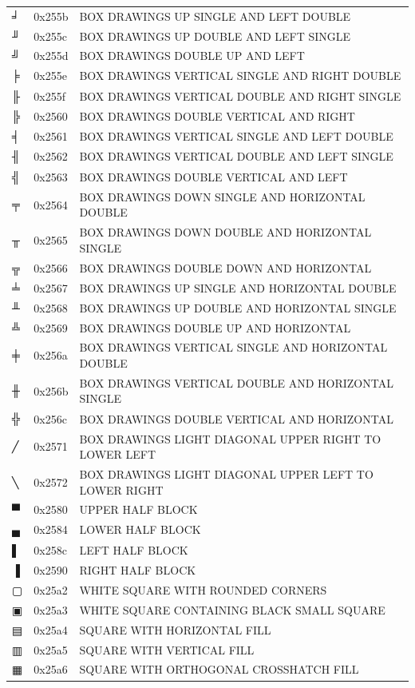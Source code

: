 \documentclass[12pt, twoside]{article}
\begin{document}
\begin{longtable}{L{1.0cm} L{2.0cm} >{\footnotesize}L{10cm}}
$╛$&0x255b&BOX DRAWINGS UP SINGLE AND LEFT DOUBLE\\
$╜$&0x255c&BOX DRAWINGS UP DOUBLE AND LEFT SINGLE\\
$╝$&0x255d&BOX DRAWINGS DOUBLE UP AND LEFT\\
$╞$&0x255e&BOX DRAWINGS VERTICAL SINGLE AND RIGHT DOUBLE\\
$╟$&0x255f&BOX DRAWINGS VERTICAL DOUBLE AND RIGHT SINGLE\\
$╠$&0x2560&BOX DRAWINGS DOUBLE VERTICAL AND RIGHT\\
$╡$&0x2561&BOX DRAWINGS VERTICAL SINGLE AND LEFT DOUBLE\\
$╢$&0x2562&BOX DRAWINGS VERTICAL DOUBLE AND LEFT SINGLE\\
$╣$&0x2563&BOX DRAWINGS DOUBLE VERTICAL AND LEFT\\
$╤$&0x2564&BOX DRAWINGS DOWN SINGLE AND HORIZONTAL DOUBLE\\
$╥$&0x2565&BOX DRAWINGS DOWN DOUBLE AND HORIZONTAL SINGLE\\
$╦$&0x2566&BOX DRAWINGS DOUBLE DOWN AND HORIZONTAL\\
$╧$&0x2567&BOX DRAWINGS UP SINGLE AND HORIZONTAL DOUBLE\\
$╨$&0x2568&BOX DRAWINGS UP DOUBLE AND HORIZONTAL SINGLE\\
$╩$&0x2569&BOX DRAWINGS DOUBLE UP AND HORIZONTAL\\
$╪$&0x256a&BOX DRAWINGS VERTICAL SINGLE AND HORIZONTAL DOUBLE\\
$╫$&0x256b&BOX DRAWINGS VERTICAL DOUBLE AND HORIZONTAL SINGLE\\
$╬$&0x256c&BOX DRAWINGS DOUBLE VERTICAL AND HORIZONTAL\\
$╱$&0x2571&BOX DRAWINGS LIGHT DIAGONAL UPPER RIGHT TO LOWER LEFT\\
$╲$&0x2572&BOX DRAWINGS LIGHT DIAGONAL UPPER LEFT TO LOWER RIGHT\\
$▀$&0x2580&UPPER HALF BLOCK\\
$▄$&0x2584&LOWER HALF BLOCK\\
$▌$&0x258c&LEFT HALF BLOCK\\
$▐$&0x2590&RIGHT HALF BLOCK\\
$▢$&0x25a2&WHITE SQUARE WITH ROUNDED CORNERS\\
$▣$&0x25a3&WHITE SQUARE CONTAINING BLACK SMALL SQUARE\\
$▤$&0x25a4&SQUARE WITH HORIZONTAL FILL\\
$▥$&0x25a5&SQUARE WITH VERTICAL FILL\\
$▦$&0x25a6&SQUARE WITH ORTHOGONAL CROSSHATCH FILL\\

\end{longtable}
\end{document}
